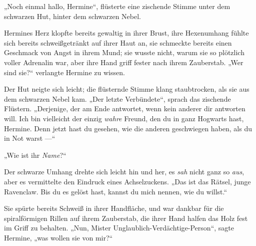 „Noch einmal hallo, Hermine“, flüsterte eine zischende Stimme unter dem schwarzen Hut, hinter dem schwarzen Nebel.

Hermines Herz klopfte bereits gewaltig in ihrer Brust, ihre Hexenumhang fühlte sich bereits schweißgetränkt auf ihrer Haut an, sie schmeckte bereits einen Geschmack von Angst in ihrem Mund; sie wusste nicht, warum sie so plötzlich voller Adrenalin war, aber ihre Hand griff fester nach ihrem Zauberstab.
„Wer sind sie?“ verlangte Hermine zu wissen.

Der Hut neigte sich leicht; die flüsternde Stimme klang staubtrocken, als sie aus dem schwarzen Nebel kam.
„Der letzte Verbündete“, sprach das zischende Flüstern.
„Derjenige, der am Ende antwortet, wenn kein anderer dir antworten will. Ich bin vielleicht der einzig \emph{wahre} Freund, den du in ganz Hogwarts hast, Hermine. Denn jetzt hast du gesehen, wie die anderen geschwiegen haben, als du in Not warst —“

„Wie ist ihr \emph{Name}?“

Der schwarze Umhang drehte sich leicht hin und her, es \emph{sah} nicht ganz so \emph{aus}, aber es vermittelte den Eindruck eines Achselzuckens.
„Das ist das Rätsel, junge Ravenclaw. Bis du es gelöst hast, kannst du mich nennen, wie du willst.“

Sie spürte bereits Schweiß in ihrer Handfläche, und war dankbar für die spiralförmigen Rillen auf ihrem Zauberstab, die ihrer Hand halfen das Holz fest im Griff zu behalten.
„Nun, Mister Unglaublich-Verdächtige-Person“, sagte Hermine, „was wollen sie von mir?“

